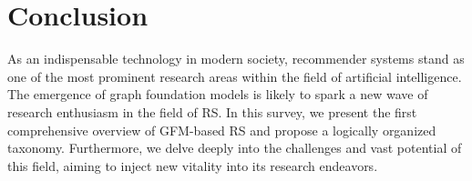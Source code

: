 \section{Conclusion}
As an indispensable technology in modern society, recommender systems stand as one of the most prominent research areas within the field of artificial intelligence. The emergence of graph foundation models is likely to spark a new wave of research enthusiasm in the field of RS. In this survey, we present the first comprehensive overview of GFM-based RS and propose a logically organized taxonomy. Furthermore, we delve deeply into the challenges and vast potential of this field, aiming to inject new vitality into its research endeavors.